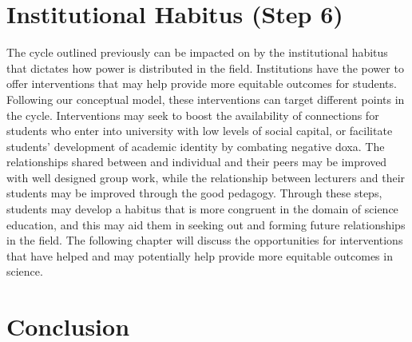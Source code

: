 \section{Institutional Habitus (Step 6)}
The cycle outlined previously can be impacted on by the institutional habitus that dictates how power is distributed in the field. Institutions have the power to offer interventions that may help provide more equitable outcomes for students. Following our conceptual model, these interventions can target different points in the cycle. Interventions may seek to boost the availability of connections for students who enter into university with low levels of social capital, or facilitate students' development of academic identity by combating negative doxa. The relationships shared between and individual and their peers may be improved with well designed group work, while the relationship between lecturers and their students may be improved through the good pedagogy. Through these steps, students may develop a habitus that is more congruent in the domain of science education, and this may aid them in seeking out and forming future relationships in the field. The following chapter will discuss the opportunities for interventions that have helped and may potentially help provide more equitable outcomes in science. 

\section{Conclusion}



